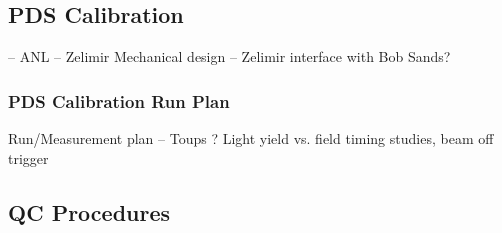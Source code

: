 \subsection{PDS Calibration} -- ANL -- Zelimir
     Mechanical design -- Zelimir interface with Bob Sands?

\subsubsection{PDS Calibration Run Plan}
     Run/Measurement plan  -- Toups ?
     Light yield vs. field
     timing studies,
     beam off trigger

\subsection{QC Procedures}

